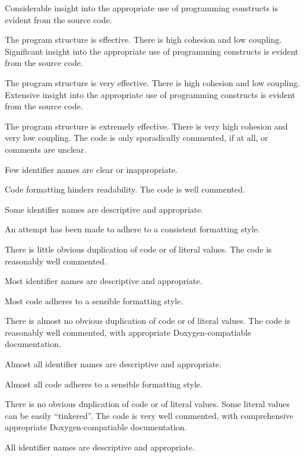 \documentclass{../../fal_assignment}
\begin{document}
\begin{markingrubric}
        \grade Considerable insight into the appropriate use of programming constructs is evident from the source code.
            \par The program structure is effective. There is high cohesion and low coupling.
        \grade Significant insight into the appropriate use of programming constructs is evident from the source code.
            \par The program structure is very effective. There is high cohesion and low coupling.
        \grade Extensive insight into the appropriate use of programming constructs is evident from the source code.
            \par The program structure is extremely effective. There is very high cohesion and very low coupling.
%
        \grade \fail The code is only sporadically commented, if at all, or comments are unclear.
            \par Few identifier names are clear or inappropriate.
            \par Code formatting hinders readability.
        \grade The code is well commented.
            \par Some identifier names are descriptive and appropriate.
            \par An attempt has been made to adhere to a consistent formatting style.
             \par There is little obvious duplication of code or of literal values.           
        \grade The code is reasonably well commented.
            \par Most identifier names are descriptive and appropriate.
            \par Most code adheres to a sensible formatting style.
             \par There is almost no obvious duplication of code or of literal values.   
        \grade The code is reasonably well commented, with appropriate Doxygen-compatiable documentation.
            \par Almost all identifier names are descriptive and appropriate.
            \par Almost all code adheres to a sensible formatting style.
             \par There is no obvious duplication of code or of literal values. Some literal values can be easily ``tinkered''. 
        \grade The code is very well commented, with comprehensive appropriate Doxygen-compatiable documentation.
            \par All identifier names are descriptive and appropriate.

\end{markingrubric}
\end{document}
